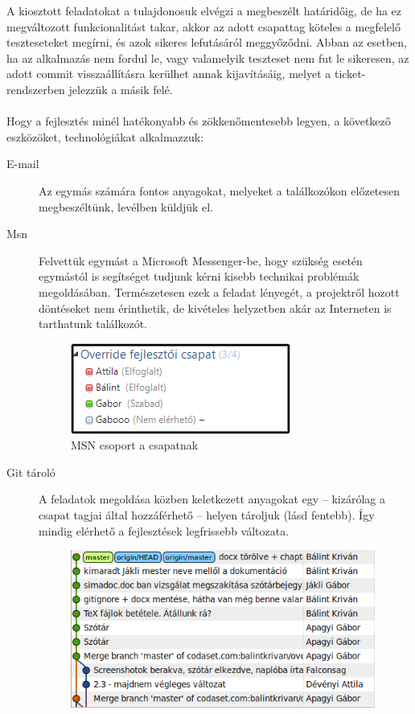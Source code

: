 A kiosztott feladatokat a tulajdonosuk elvégzi a megbeszélt határidőig, de ha ez megváltozott funkcionalitást takar, akkor az adott csapattag köteles a megfelelő teszteseteket megírni, és azok sikeres lefutásáról meggyőződni. Abban az esetben, ha az alkalmazás nem fordul le, vagy valamelyik teszteset nem fut le sikeresen, az adott commit visszaállításra kerülhet annak kijavításáig, melyet a ticket-rendszerben jelezzük a másik felé.\\
\\
Hogy a fejlesztés minél hatékonyabb és zökkenőmentesebb legyen, a következő eszközöket, technológiákat alkalmazzuk:
\begin{description}
\item[E-mail] Az egymás számára fontos anyagokat, melyeket a találkozókon előzetesen megbeszéltünk, levélben küldjük el.
\item[Msn] Felvettük egymást a Microsoft Messenger-be, hogy szükség esetén egymástól is segítséget tudjunk kérni kisebb technikai problémák megoldásában. Természetesen ezek a feladat lényegét, a projektről hozott döntéseket nem érinthetik, de kivételes helyzetben akár az Interneten is tarthatunk találkozót.
\begin{figure}[h]
\begin{center}
\includegraphics{chapters/chapter02/msn.png}
\caption{MSN csoport a csapatnak}
\label{fig:msn}
\vspace{-20pt}
\end{center}
\end{figure}
\item[Git tároló] A feladatok megoldása közben keletkezett anyagokat egy -- kizárólag a csapat tagjai által hozzáférhető -- helyen tároljuk (lásd fentebb). Így mindig elérhető a fejlesztések legfrissebb változata.
\begin{figure}[h]
\begin{center}
\includegraphics[width=10cm]{chapters/chapter02/git.png}

\end{center}
\end{figure}
\end{description}

